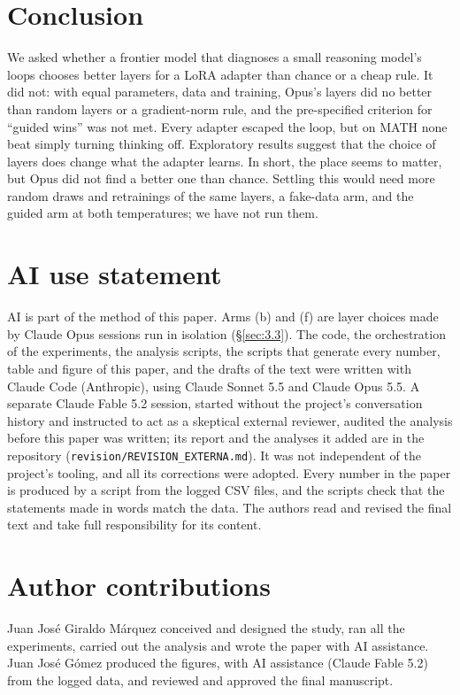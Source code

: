 \documentclass[11pt]{article}
\begin{document}
\section{Conclusion}\label{sec:7}

We asked whether a frontier model that diagnoses a small reasoning model's loops chooses better layers for a LoRA adapter than chance or a cheap rule. It did not: with equal parameters, data and training, Opus's layers did no better than random layers or a gradient-norm rule, and the pre-specified criterion for ``guided wins'' was not met. Every adapter escaped the loop, but on MATH none beat simply turning thinking off. Exploratory results suggest that the choice of layers does change what the adapter learns. In short, the place seems to matter, but Opus did not find a better one than chance. Settling this would need more random draws and retrainings of the same layers, a fake-data arm, and the guided arm at both temperatures; we have not run them.

\section{AI use statement}\label{sec:8}

AI is part of the method of this paper. Arms (b) and (f) are layer choices made by Claude Opus sessions run in isolation (\S\ref{sec:3.3}). The code, the orchestration of the experiments, the analysis scripts, the scripts that generate every number, table and figure of this paper, and the drafts of the text were written with Claude Code (Anthropic), using Claude Sonnet 5.5 and Claude Opus 5.5. A separate Claude Fable 5.2 session, started without the project's conversation history and instructed to act as a skeptical external reviewer, audited the analysis before this paper was written; its report and the analyses it added are in the repository (\texttt{revision/REVISION\_EXTERNA.md}). It was not independent of the project's tooling, and all its corrections were adopted. Every number in the paper is produced by a script from the logged CSV files, and the scripts check that the statements made in words match the data. The authors read and revised the final text and take full responsibility for its content.

\section*{Author contributions}

Juan José Giraldo Márquez conceived and designed the study, ran all the experiments, carried out the analysis and wrote the paper with AI assistance. Juan José Gómez produced the figures, with AI assistance (Claude Fable 5.2) from the logged data, and reviewed and approved the final manuscript.
\end{document}
